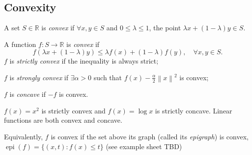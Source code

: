 \subsection{Convexity}
\begin{definition}
    A set $S\in \mathbb{R}$ is \textit{convex} if $ \forall x,y\in S $ and $ 0\le \lambda\le 1 $, the point $ \lambda x+ (1-\lambda) y \in S $. 
\end{definition}
\begin{definition}
    A function $f:S\to \mathbb{R}$ is \textit{convex} if 
    \[
        f(\lambda x+(1-\lambda)y)\le \lambda f(x)+ (1-\lambda)f(y),\quad \forall x,y\in S.
    \]
    $f$ is \textit{strictly convex} if the inequality is always strict; 

    $f$ is \textit{strongly convex} if $ \exists \alpha>0$ such that $ f(x)-\frac{\alpha}{2}\left\| x \right\|^2 $ is convex; 

    $f$ is \textit{concave} if $-f$ is convex.
\end{definition}

\begin{example}
    $f(x)=x^2$ is strictly convex and $ f(x)=\log x $ is strictly concave. Linear functions are both convex and concave.
\end{example}

\begin{note}
    Equivalently, $f$ is convex if the set above its graph (called its \textit{epigraph}) is convex, $\operatorname{epi}(f)=\{(x, t): f(x) \leq t\}$ (see example sheet TBD)
\end{note}

